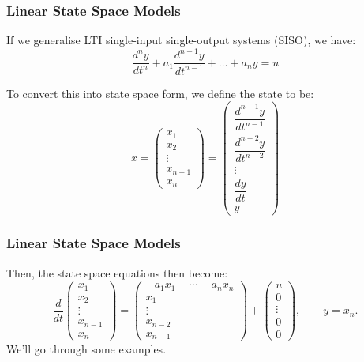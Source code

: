 \documentclass{beamer}
\begin{document}
\begin{frame}
\frametitle{Linear State Space Models}
If we generalise LTI single-input single-output systems (SISO), we have: 
\begin{equation}
    \frac{d^n y}{dt^n} + a_1 \frac{d^{n-1}y}{dt^{n-1}} + \dots + a_n y = u
\end{equation}

To convert this into state space form, we define the state to be: 
\begin{equation}
x = 
\begin{pmatrix}
x_1 \\[4pt]
x_2 \\[4pt]
\vdots \\[4pt]
x_{n-1} \\[4pt]
x_n
\end{pmatrix}
=
\begin{pmatrix}
\dfrac{d^{n-1}y}{dt^{n-1}} \\[6pt]
\dfrac{d^{n-2}y}{dt^{n-2}} \\[6pt]
\vdots \\[6pt]
\dfrac{dy}{dt} \\[6pt]
y
\end{pmatrix}
\end{equation}

\end{frame}

\begin{frame}
\frametitle{Linear State Space Models}
Then, the state space equations then become: 
\begin{equation}
\frac{d}{dt}
\begin{pmatrix}
x_1 \\[4pt]
x_2 \\[4pt]
\vdots \\[4pt]
x_{n-1} \\[4pt]
x_n
\end{pmatrix}
=
\begin{pmatrix}
 -a_1 x_1 - \cdots - a_n x_n \\[4pt]
 x_1 \\[4pt]
 \vdots \\[4pt]
 x_{n-2} \\[4pt]
 x_{n-1}
\end{pmatrix}
+
\begin{pmatrix}
u \\[4pt]
0 \\[4pt]
\vdots \\[4pt]
0 \\[4pt]
0
\end{pmatrix},
\qquad
y = x_n.
\end{equation}
We'll go through some examples.
\end{frame}
\end{document}
